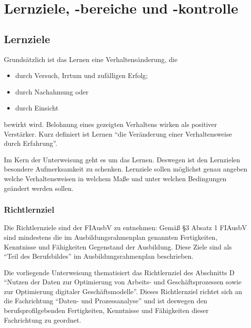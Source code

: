 \chapter{Lernziele, -bereiche und -kontrolle}

\section{Lernziele}
Grundsätzlich ist das Lernen eine Verhaltensänderung, die 

\begin{itemize}
	\item durch Versuch, Irrtum und zufälligen Erfolg;
	\item durch Nachahmung oder 
	\item durch Einsicht
\end{itemize}

bewirkt wird. Belohnung eines gezeigten Verhaltens wirken als positiver Verstärker. Kurz definiert ist Lernen \enquote{die Veränderung einer Verhaltensweise durch Erfahrung}.
\par
Im Kern der Unterweisung geht es um das Lernen. Deswegen ist den Lernzielen besondere Aufmerksamkeit zu schenken. Lernziele sollen möglichst genau angeben welche Verhaltensweisen in welchem Maße und unter welchen Bedingungen geändert werden sollen. 

\subsection{Richtlernziel}
Die Richtlernziele sind der \ac{FIAusbV} zu entnehmen: Gemäß §3 Absatz 1 FIAusbV\autocite[][§3 I FIAusbV]{bundesminister_fur_wirtschaft_und_energie_verordnung_2020} sind mindestens die im Ausbildungsrahmenplan genannten Fertigkeiten, Kenntnisse und Fähigkeiten Gegenstand der Ausbildung. Diese Ziele sind als \enquote{Teil des Berufsbildes} im Ausbildungsrahmenplan beschrieben. 
\par
Die vorliegende Unterweisung thematisiert das Richtlernziel des Abschnitts D \enquote{Nutzen der Daten zur Optimierung von Arbeits- und Geschäftsprozessen sowie zur Optimierung digitaler Geschäftsmodelle}\autocite[vgl.][§4 V Nr.\,3 FIAusbV]{bundesminister_fur_wirtschaft_und_energie_verordnung_2020}. Dieses Richtlernziel richtet sich an die Fachrichtung \enquote{Daten- und Prozessanalyse} und ist deswegen den berufsprofilgebenden Fertigkeiten, Kenntnisse und Fähigkeiten dieser Fachrichtung zu geordnet.

